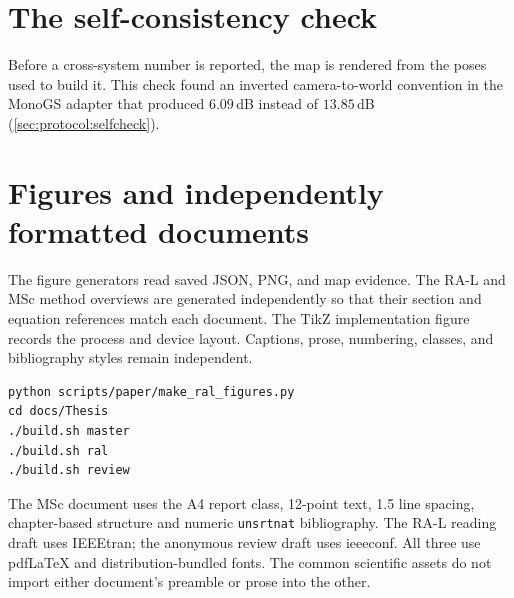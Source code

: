 \section{The self-consistency check}

Before a cross-system number is reported, the map is rendered from the poses
used to build it. This check found an inverted camera-to-world convention in
the MonoGS adapter that produced $6.09$\,dB instead of $13.85$\,dB
(\cref{sec:protocol:selfcheck}).

\section{Figures and independently formatted documents}

The figure generators read saved JSON, PNG, and map evidence.
The RA-L and MSc method overviews are generated independently so that their
section and equation references match each document. The TikZ implementation
figure records the process and device layout. Captions, prose, numbering,
classes, and bibliography styles remain independent.

\begin{small}
\begin{verbatim}
python scripts/paper/make_ral_figures.py
cd docs/Thesis
./build.sh master
./build.sh ral
./build.sh review
\end{verbatim}
\end{small}

The MSc document uses the A4 report class, 12-point text, 1.5 line spacing,
chapter-based structure and numeric \texttt{unsrtnat} bibliography.
The RA-L reading draft uses IEEEtran; the anonymous review draft uses
ieeeconf. All three use pdfLaTeX and distribution-bundled fonts.
The common scientific assets do not import either document's preamble
or prose into the other.
